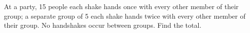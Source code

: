 At a party, 15 people each shake hands once with every other member of their group; a separate group of 5 each shake hands twice with every other member of their group. No handshakes occur between groups. Find the total.
